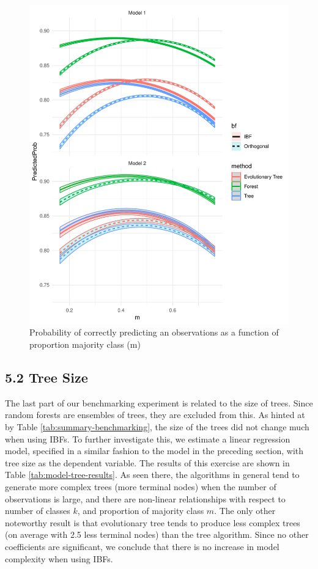 \documentclass[]{elsarticle} %
\makeatletter
\def\maxwidth{\ifdim\Gin@nat@width>\linewidth\linewidth
\else\Gin@nat@width\fi}
\let\Oldincludegraphics\includegraphics
\renewcommand{\includegraphics}[1]{\Oldincludegraphics[width=\maxwidth]{#1}}
\makeatother
\begin{document}
\begin{figure}
\centering
\includegraphics{Trees_with_Base_Functions_v3_files/figure-latex/fig15-estimated-accuracy-m-1.pdf}
\caption{\label{fig:fig15-estimated-accuracy-m}Probability of correctly
predicting an observations as a function of proportion majority class
(m)}
\end{figure}

\subsection{5.2 Tree Size}\label{tree-size}

The last part of our benchmarking experiment is related to the size of
trees. Since random forests are ensembles of trees, they are excluded
from this. As hinted at by Table \ref{tab:summary-benchmarking}, the
size of the trees did not change much when using IBFs. To further
investigate this, we estimate a linear regression model, specified in a
similar fashion to the model in the preceding section, with tree size as
the dependent variable. The results of this exercise are shown in Table
\ref{tab:model-tree-results}. As seen there, the algorithms in general
tend to generate more complex trees (more terminal nodes) when the
number of observations is large, and there are non-linear relationships
with respect to number of classes \(k\), and proportion of majority
class \(m\). The only other noteworthy result is that evolutionary tree
tends to produce less complex trees (on average with 2.5 less terminal
nodes) than the tree algorithm. Since no other coefficients are
significant, we conclude that there is no increase in model complexity
when using IBFs.
\end{document}
